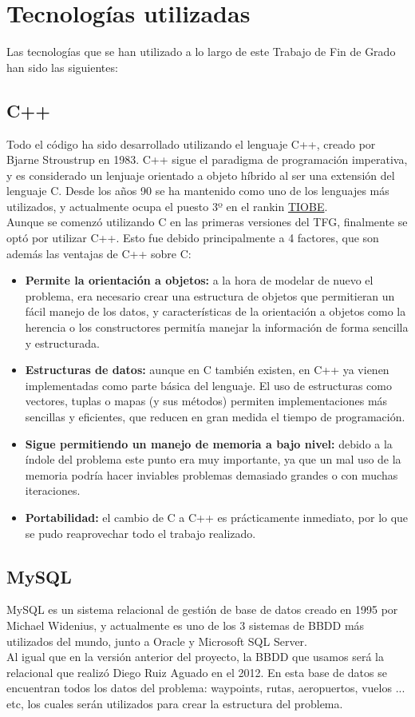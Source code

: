 \chapter{Tecnologías utilizadas}
\label{tecnologías}
Las tecnologías que se han utilizado a lo largo de este Trabajo de Fin de Grado han sido las siguientes:

\section{C++}
Todo el código ha sido desarrollado utilizando el lenguaje C++, creado por  Bjarne Stroustrup en 1983. C++ sigue el paradigma de programación imperativa, y es considerado un lenjuaje orientado a objeto híbrido al ser una extensión del lenguaje C. Desde los años 90 se ha mantenido como uno de los lenguajes más utilizados, y actualmente ocupa el puesto 3º en el rankin \href{http://www.tiobe.com/tiobe-index/}{TIOBE}.\\

Aunque se comenzó utilizando C en las primeras versiones del TFG, finalmente se optó por utilizar C++. Esto fue debido principalmente a 4 factores, que son además las ventajas de C++ sobre C:
\begin{itemize}
	\item \textbf{Permite la orientación a objetos: }a la hora de modelar de nuevo el problema, era necesario crear una estructura de objetos que permitieran un fácil manejo de los datos, y características de la orientación a objetos como la herencia o los constructores permitía manejar la información de forma sencilla y estructurada.
	\item \textbf{Estructuras de datos: }aunque en C también existen, en C++ ya vienen implementadas como parte básica del lenguaje. El uso de estructuras como vectores, tuplas o mapas (y sus métodos) permiten implementaciones más sencillas y eficientes, que reducen en gran medida el tiempo de programación.
	\item \textbf{Sigue permitiendo un manejo de memoria a bajo nivel: }debido a la índole del problema este punto era muy importante, ya que un mal uso de la memoria podría hacer inviables problemas demasiado grandes o con muchas iteraciones.
	\item \textbf{Portabilidad:} el cambio de C a C++ es prácticamente inmediato, por lo que se pudo reaprovechar todo el trabajo realizado.
\end{itemize}
                  

\section{MySQL}
MySQL es un sistema relacional de gestión de base de datos creado en 1995 por Michael Widenius, y actualmente es uno de los 3 sistemas de BBDD más utilizados del mundo, junto a Oracle y Microsoft SQL Server.\\
Al igual que en la versión anterior del proyecto, la BBDD que usamos será la relacional que realizó Diego Ruiz Aguado en el 2012. En esta base de datos se encuentran todos los datos del problema: waypoints, rutas, aeropuertos, vuelos ... etc, los cuales serán utilizados para crear la estructura del problema.

